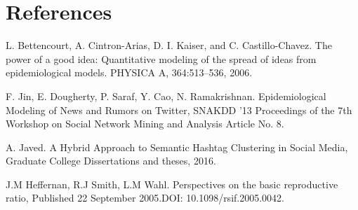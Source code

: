 \documentclass{article}
\begin{document}
\section{References}
\begin{enumerate}[label={[\arabic*]}]
\item  L. Bettencourt, A. Cintron-Arias, D. I. Kaiser, and C. Castillo-Chavez. The power of a good idea: Quantitative modeling of the spread of ideas from epidemiological models. PHYSICA A, 364:513–536, 2006.
\item F. Jin, E. Dougherty, P. Saraf, Y. Cao, N. Ramakrishnan. Epidemiological Modeling of News and Rumors on Twitter, SNAKDD '13 Proceedings of the 7th Workshop on Social Network Mining and Analysis
Article No. 8.
\item A. Javed. A Hybrid Approach to Semantic Hashtag Clustering in Social Media, Graduate College Dissertations and  theses, 2016.
\item J.M Heffernan, R.J Smith, L.M Wahl. Perspectives on the basic reproductive ratio, Published 22 September 2005.DOI: 10.1098/rsif.2005.0042.
\end{enumerate}
\end{document}

